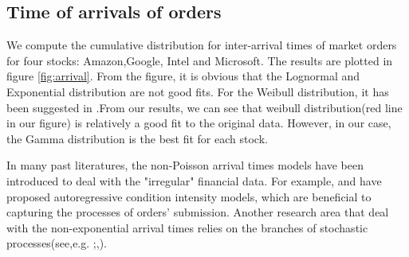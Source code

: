 \subsection{Time of arrivals of orders}
We compute the cumulative distribution for inter-arrival times of market orders for four stocks: Amazon,Google, Intel and Microsoft. The results are plotted in figure \ref{fig:arrival}.
From the figure, it is obvious that the Lognormal and Exponential distribution are not good fits. For the Weibull distribution, it has been suggested in \cite{ivanov2004common}.From our results, we can see that weibull distribution(red line in our figure) is relatively a good fit to the original data. However, in our case, the Gamma distribution is the best fit for each stock. 

In many past literatures, the non-Poisson arrival times models have been introduced to deal with the "irregular" financial data. For example,\cite{engle1997forecasting} and \cite{engle2000econometrics} have proposed autoregressive condition intensity models, which are beneficial to capturing the processes of orders' submission. Another research area that deal with the non-exponential arrival times relies on the branches of stochastic processes(see,e.g. \cite{clark1973subordinated};\cite{silva2007stochastic},\cite{huth2012times}). 


